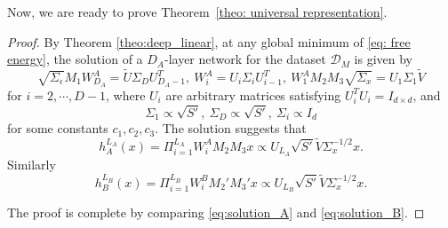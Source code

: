 \documentclass{article}
\theoremstyle{plain}
\begin{document}
Now, we are ready to prove Theorem~\ref{theo: universal representation}.
\begin{proof}
By Theorem \ref{theo:deep_linear}, at any global minimum of \eqref{eq: free energy}, the solution of a $D_A$-layer network for the dataset $\mathcal{D}_M$ is given by
\begin{equation}
\sqrt{\Sigma_\epsilon}M_1W^A_{D_A}=\tilde{U}\Sigma_DU_{D_A-1}^T,\ W^A_i=U_i\Sigma_iU_{i-1}^T,\ W^A_1M_2M_3\sqrt{\Sigma_x}=U_1\Sigma_1\tilde{V}
\end{equation}
for $i=2,\cdots,D-1$, where $U_i$ are arbitrary matrices satisfying $U_i^TU_i=I_{d\times d}$, and
\begin{equation}
\Sigma_1\propto\sqrt{S'},\ \Sigma_D\propto\sqrt{S'},\ \Sigma_i\propto I_d
\end{equation}
for some constants $c_1,c_2,c_3$. The solution suggests that
\begin{equation}
h_A^{L_A}(x)=\Pi_{i=1}^{L_A}W_i^AM_2M_3x\propto U_{L_A}\sqrt{S'}\tilde{V}\Sigma_x^{-1/2}x.
\label{eq:solution_A}
\end{equation}
Similarly
\begin{equation}
h_B^{L_B}(x)=\Pi_{i=1}^{L_B}W_i^BM_2'M_3'x\propto U_{L_B}\sqrt{S'}\tilde{V}\Sigma_x^{-1/2}x.
\label{eq:solution_B}
\end{equation}

The proof is complete by comparing \eqref{eq:solution_A} and \eqref{eq:solution_B}.
\end{proof}
\end{document}

